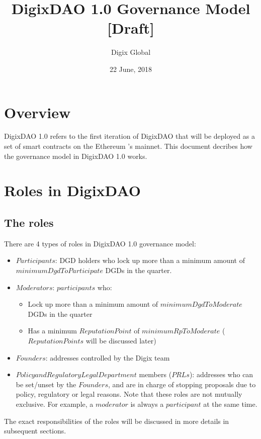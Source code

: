 \documentclass[11pt,a4paper,titlepage]{article}
\title{\blueb DigixDAO 1.0 Governance Model [Draft]}
\author{Digix Global}
\date{22 June, 2018}
\begin{document}
\maketitle

\section{Overview}{
	DigixDAO 1.0 refers to the first iteration of DigixDAO that will be deployed as a set of smart contracts on the Ethereum 's mainnet. This document decribes how the governance model in DigixDAO 1.0 works.
}

\section{Roles in DigixDAO}{
	\subsection{The roles} {
		There are 4 types of roles in DigixDAO 1.0 governance model:
		\begin{itemize}
			\item $Participants$: DGD holders who lock up more than a minimum amount of $minimumDgdToParticipate$ DGDs in the quarter.
			\item $Moderators$: $participants$ who:
			\begin{itemize}
				\item Lock up more than a minimum amount of $minimumDgdToModerate$ DGDs in the quarter
				\item Has a minimum $Reputation Point$ of $minimumRpToModerate$ ($Reputation Points$ will be discussed later)
			\end{itemize}
			\item $Founders$: addresses controlled by the Digix team
			\item $Policy and Regulatory Legal Department$ members ($PRLs$): addresses who can be set/unset by the $Founders$, and are in charge of stopping proposals due to policy, regulatory or legal reasons.
		Note that these roles are not mutually exclusive. For example, a $moderator$ is always a $participant$ at the same time.
		\end{itemize}
		The exact responsibilities of the roles will be discussed in more details in subsequent sections.
	}
}
\end{document}
